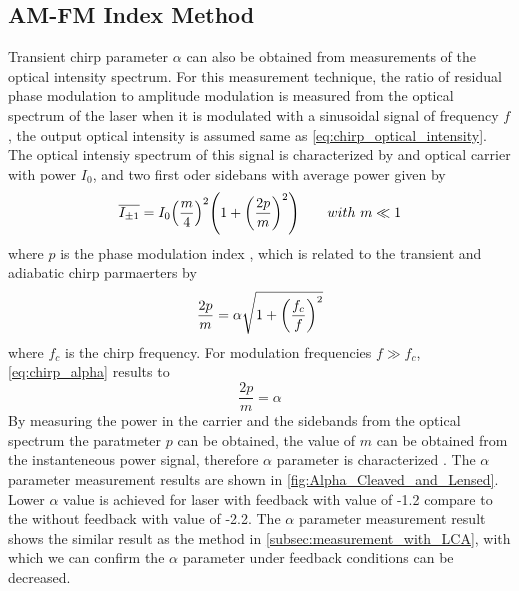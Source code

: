 \subsection{AM-FM Index Method}
Transient chirp parameter $\alpha$ can also be obtained from measurements of the optical intensity spectrum. For this measurement technique, the ratio of residual phase modulation to amplitude modulation is measured from the optical spectrum of the laser when it is modulated with a sinusoidal signal of frequency $f$, the output optical intensity is assumed same as \autoref{eq:chirp_optical_intensity}. The optical intensiy spectrum of this signal is characterized by and optical carrier with power $I_0$, and two first oder sidebans with average power given by \cite{harder1983measurement}
\begin{equation}
    \overline{I_{\pm 1}}=I_0\qty(\frac{m}{4})^2\qty(1+\qty(\frac{2p}{m})^2) \qquad with \ m \ll 1
\end{equation}
where $p$ is the phase modulation index \cite{harder1983measurement}, which is related to the transient and adiabatic chirp parmaerters by \cite{bjerkan1996measurement}
\begin{equation}
    \frac{2p}{m}=\alpha\sqrt{1+\qty(\frac{f_c}{f})^2}
    \label{eq:chirp_alpha}
\end{equation}
where $f_c$ is the chirp frequency. For modulation frequencies $f \gg f_c$, \autoref{eq:chirp_alpha} results to \cite{harder1983measurement}
\begin{equation}
    \frac{2p}{m}=\alpha
    \label{eq:chirp_alpha_2}
\end{equation}
By measuring the power in the carrier and the sidebands from the optical spectrum the paratmeter $p$ can be obtained, the value of $m$ can be obtained from the instanteneous power signal, therefore $\alpha$ parameter is characterized \cite{harder1983measurement, villafranca2007precise}. The $\alpha$ parameter measurement results are shown in \autoref{fig:Alpha_Cleaved_and_Lensed}. Lower $\alpha$ value is achieved for laser with feedback with value of -1.2 compare to the without feedback with value of -2.2. The $\alpha$ parameter measurement result shows the similar result as the method in \autoref{subsec:measurement_with_LCA}, with which we can confirm the $\alpha$ parameter under feedback conditions can be decreased.
